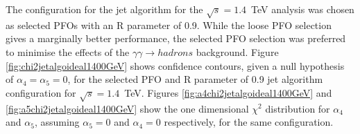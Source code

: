 The configuration for the jet algorithm for the $\sqrt{s}=1.4$~TeV analysis was chosen as selected PFOs with an R parameter of 0.9.  While the loose PFO selection gives a marginally better performance, the selected PFO selection was preferred to minimise the effects of the $\gamma\gamma \rightarrow hadrons$ background.  Figure \ref{fig:chi2jetalgoideal1400GeV} shows confidence contours, given a null hypothesis of $\alpha_{4} = \alpha_{5} = 0$, for the selected PFO and R parameter of 0.9 jet algorithm configuration for $\sqrt{s}=1.4$~TeV.  Figures \ref{fig:a4chi2jetalgoideal1400GeV} and \ref{fig:a5chi2jetalgoideal1400GeV} show the one dimensional $\chi^{2}$ distribution for $\alpha_{4}$ and $\alpha_{5}$, assuming $\alpha_{5} = 0$ and $\alpha_{4} = 0$ respectively, for the same configuration.  

\begin{figure}[h!]
\centering
{}\hfill
{}

\end{figure}
